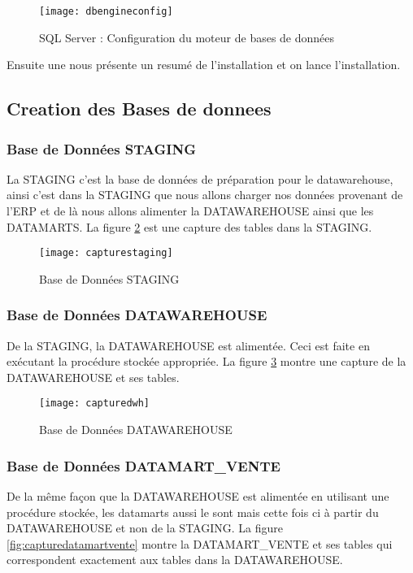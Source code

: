 \begin{figure}[H]
    \centering
    \texttt{[image: dbengineconfig]}
    \caption{SQL Server : Configuration du moteur de  bases de données}
    \label{fig:dbengineconfig}
\end{figure}

Ensuite une nous présente un resumé de l'installation et on lance l'installation.


\subsection{Creation des Bases de donnees}
\subsubsection{Base de Données STAGING}
La STAGING c’est la base de données de préparation pour le datawarehouse, ainsi c’est dans la STAGING que nous allons charger nos données provenant de l’ERP et de là nous allons alimenter la DATAWAREHOUSE ainsi que les DATAMARTS. La figure \ref{fig:capturestaging} est une capture des tables dans la STAGING. 

\begin{figure}[H]
    \centering
    \texttt{[image: capturestaging]}
    \caption{Base de Données STAGING}
    \label{fig:capturestaging}
\end{figure}


\subsubsection{Base de Données DATAWAREHOUSE}

De la STAGING, la DATAWAREHOUSE est alimentée. Ceci est faite en exécutant la procédure stockée appropriée. La figure \ref{fig:capturedwh} montre une capture de la DATAWAREHOUSE et ses tables.

\begin{figure}[H]
    \centering
    \texttt{[image: capturedwh]}
    \caption{Base de Données DATAWAREHOUSE}
    \label{fig:capturedwh}
\end{figure}
 
\subsubsection{Base de Données DATAMART\_VENTE}

De la même façon que la DATAWAREHOUSE est alimentée en utilisant une procédure stockée, les datamarts aussi le sont mais cette fois ci à partir du DATAWAREHOUSE et non de la STAGING. La figure \ref{fig:capturedatamartvente} montre la DATAMART\_VENTE et ses tables qui correspondent exactement aux tables dans la DATAWAREHOUSE.

